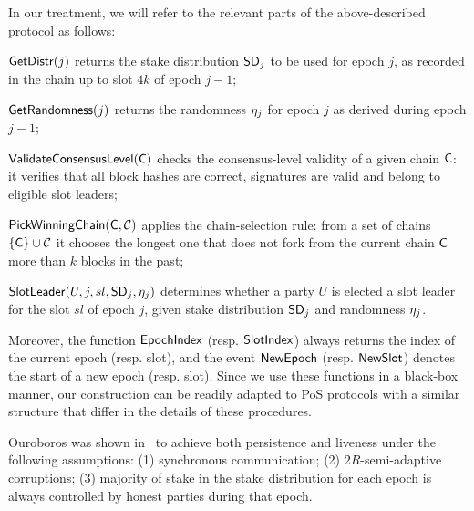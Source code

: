 In our treatment, we will refer to the relevant parts of the above-described protocol as
follows:
\begin{description}
\item
  $\mathsf{GetDistr}(j)$
  returns the stake distribution $\mathsf{SD}_j$ to be used for epoch $j$, as recorded in the
    chain up to slot $4k$ of epoch $j-1$;

\item
  $\mathsf{GetRandomness}(j)$
  returns the randomness $\eta_j$ for epoch $j$ as derived during epoch $j-1$;
\item
  $\mathsf{ValidateConsensusLevel}(\mathsf{C})$
  checks the consensus-level validity of a given chain $\mathsf{C}$: it verifies that all block hashes
    are correct, signatures are valid and belong to eligible slot leaders;
\item
  $\mathsf{PickWinningChain}(\mathsf{C},\mathcal{C})$
    applies the chain-selection rule: from a set of chains $\{\mathsf{C}\}\cup\mathcal{C}$ it
    chooses the longest one that does not fork from the current chain $\mathsf{C}$
    more than $k$ blocks in the past;
\item
  $\mathsf{SlotLeader}(U,j,sl,\mathsf{SD}_j,\eta_{j})$
  determines whether a party $U$ is elected a slot leader for the slot $sl$ of
    epoch $j$, given stake distribution $\mathsf{SD}_j$ and randomness $\eta_{j}$.
\end{description}
Moreover, the function $\mathsf{EpochIndex}$ (resp. $\mathsf{SlotIndex}$) always returns
the index of the current epoch (resp. slot), and the event $\mathsf{NewEpoch}$ (resp.
$\mathsf{NewSlot}$) denotes the start of a new epoch (resp. slot).
Since we use these functions in a black-box manner, our construction can be
readily adapted to PoS protocols with a similar structure that differ in the
details of these procedures.

Ouroboros was shown in~\cite{C:KRDO17} to achieve
both persistence and liveness
under the following assumptions:
(1) synchronous communication;
(2) $2R$-semi-adaptive corruptions;
(3) majority of stake in the stake distribution for each epoch is
always controlled by honest parties during that epoch.
